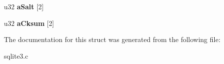 \begin{DoxyCompactItemize}
\item 
\hypertarget{struct_wal_index_hdr_af99b92f673fd7ba1e4e4f9feb955453f}{u32 {\bfseries a\-Salt} \mbox{[}2\mbox{]}}\label{struct_wal_index_hdr_af99b92f673fd7ba1e4e4f9feb955453f}

\item 
\hypertarget{struct_wal_index_hdr_aa202339b02766d088717bfce9e3a9c0e}{u32 {\bfseries a\-Cksum} \mbox{[}2\mbox{]}}\label{struct_wal_index_hdr_aa202339b02766d088717bfce9e3a9c0e}

\end{DoxyCompactItemize}


The documentation for this struct was generated from the following file\-:\begin{DoxyCompactItemize}
\item 
sqlite3.\-c\end{DoxyCompactItemize}
